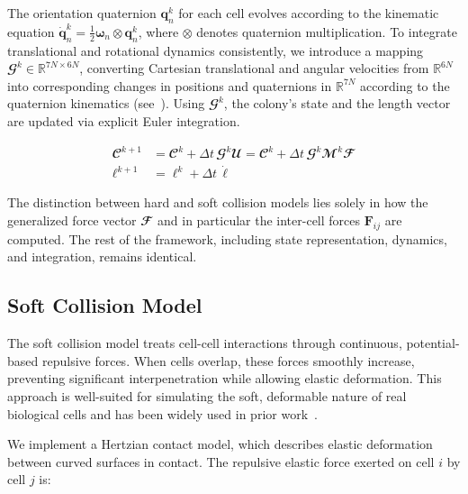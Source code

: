 \documentclass[conference]{IEEEtran}
\begin{document}
The orientation quaternion $\mathbf{q}_n^k$ for each cell evolves according to the kinematic equation $\dot{\mathbf{q}}_n^k = \frac{1}{2} \boldsymbol{\omega}_n \otimes \mathbf{q}_n^k$, where $\otimes$ denotes quaternion multiplication. To integrate translational and rotational dynamics consistently, we introduce a mapping $\mathbfcal{G}^k \in \mathbb{R}^{7N \times 6N}$, converting Cartesian translational and angular velocities from $\mathbb{R}^{6N}$ into corresponding changes in positions and quaternions in $\mathbb{R}^{7N}$ according to the quaternion kinematics (see~\cite{Weady2024SM,Yan2022,Tasora2008}). Using $\mathbfcal{G}^k$, the colony's state and the length vector are updated via explicit Euler integration.

\begin{equation} \label{eq:colony_update}
    \begin{aligned}
        \mathbfcal{C}^{k+1}     & = \mathbfcal{C}^k + \Delta t \, \mathbfcal{G}^k \mathbfcal{U} = \mathbfcal{C}^k + \Delta t \, \mathbfcal{G}^k \mathbfcal{M}^k \mathbfcal{F} \\
        \boldsymbol{\ell}^{k+1} & = \boldsymbol{\ell}^k + \Delta t \, \dot{\boldsymbol{\ell}}
    \end{aligned}
\end{equation}

The distinction between hard and soft collision models lies solely in how the generalized force vector $\mathbfcal{F}$ and in particular the inter-cell forces $\mathbf{F}_{ij}$ are computed. The rest of the framework, including state representation, dynamics, and integration, remains identical.

\subsection{Soft Collision Model}

The soft collision model treats cell-cell interactions through continuous, potential-based repulsive forces. When cells overlap, these forces smoothly increase, preventing significant interpenetration while allowing elastic deformation. This approach is well-suited for simulating the soft, deformable nature of real biological cells and has been widely used in prior work~\cite{Warren2019, You2018,Blanchard2015,Ghosh2015,Khan_2024,You_2021,Valdez2025,Rudge2013,Langeslay_2023}.

We implement a Hertzian contact model, which describes elastic deformation between curved surfaces in contact. The repulsive elastic force exerted on cell $i$ by cell $j$ is:
\end{document}
